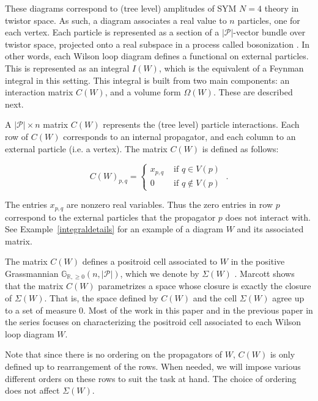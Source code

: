 \documentclass[11pt]{article}
\newcommand{\R}{\mathbb{R}}
\newcommand{\Gr}{\mathbb{G}_{\R, \geq 0}}
\newcommand{\cP}{\mathcal{P}}
\theoremstyle{remark}
\theoremstyle{definition}
\begin{document}
These diagrams correspond to (tree level) amplitudes of SYM $N=4$ theory in twistor space. As such, a diagram associates a real value to $n$ particles, one for each vertex. Each particle is represented as a section of a $|\cP|$-vector bundle over twistor space, projected onto a real subspace in a process called bosonization \cite{Arkani-Hamed:2013jha}. In other words, each Wilson loop diagram defines a functional on external particles. This is represented as an integral $I(W)$, which is the equivalent of a Feynman integral in this setting. This integral is built from two main components: an interaction matrix $C(W)$, and a volume form $\Omega(W)$. These are described next.

A $|\cP| \times n$ matrix $C(W)$ represents the (tree level) particle interactions. Each row of $C(W)$ corresponds to an internal propagator, and each column to an external particle (i.e. a vertex). The matrix $C(W)$ is defined as follows:

\begin{equation} C(W)_{p,q} = \begin{cases} x_{p,q} & \textrm{ if } q \in V(p) \\
0  & \textrm{ if } q \not \in V(p)  \end{cases}
\;. \label{C(W) dfn}\end{equation} 

The entries $x_{p,q}$ are nonzero real variables. Thus the zero entries in row $p$ correspond to the external particles that the propagator $p$ does not interact with. See Example~\ref{integraldetails} for an example of a diagram $W$ and its associated matrix.

The matrix $C(W)$ defines a positroid cell associated to $W$ in the positive Grassmannian $\Gr(n, |\cP|)$, which we denote by $\Sigma(W)$ \cite{wilsonloop}. Marcott \cite{WLDdim} shows that  the matrix $C(W)$ parametrizes a space whose closure is exactly the closure of $\Sigma(W)$. That is, the space defined by $C(W)$ and the cell $\Sigma(W)$ agree up to a set of measure $0$. Most of the work in this paper and in the previous paper in the series \cite{generalcombinatoricsI} focuses on characterizing the positroid cell associated to each Wilson loop diagram $W$. 

Note that since there is no ordering on the propagators of $W$, $C(W)$ is only defined up to rearrangement of the rows. When needed, we will impose various different orders on these rows to suit the task at hand. The choice of ordering does not affect $\Sigma(W)$.
\end{document}
